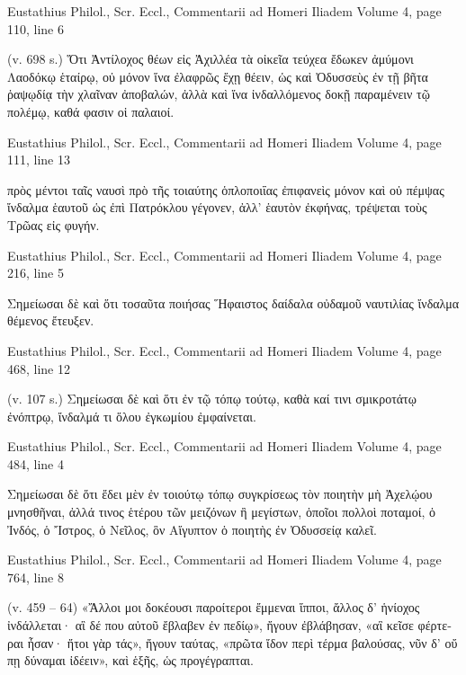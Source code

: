 \documentclass[12pt,letterpaper,twoside,final]{memoir}
\begin{document}
\begin{greek}
Eustathius Philol., Scr. Eccl., Commentarii ad Homeri Iliadem 
Volume 4, page 110, line 6

                                                               (v. 698 s.) Ὅτι 
Ἀντίλοχος θέων εἰς Ἀχιλλέα τὰ οἰκεῖα τεύχεα ἔδωκεν ἀμύμονι Λαοδόκῳ 
ἑταίρῳ, οὐ μόνον ἵνα ἐλαφρῶς ἔχῃ θέειν, ὡς καὶ Ὀδυσσεὺς ἐν τῇ βῆτα ῥαψῳδίᾳ 
τὴν χλαῖναν ἀποβαλών, ἀλλὰ καὶ ἵνα ἰνδαλλόμενος δοκῇ παραμένειν τῷ 
πολέμῳ, καθά φασιν οἱ παλαιοί. 



Eustathius Philol., Scr. Eccl., Commentarii ad Homeri Iliadem 
Volume 4, page 111, line 13

                                                                           πρὸς μέντοι ταῖς 
ναυσὶ πρὸ τῆς τοιαύτης ὁπλοποιΐας ἐπιφανεὶς μόνον καὶ οὐ πέμψας ἴνδαλμα 
ἑαυτοῦ ὡς ἐπὶ Πατρόκλου γέγονεν, ἀλλ' ἑαυτὸν ἐκφήνας, τρέψεται τοὺς Τρῶας 
εἰς φυγήν. 



Eustathius Philol., Scr. Eccl., Commentarii ad Homeri Iliadem 
Volume 4, page 216, line 5

                                                                         Σημείωσαι δὲ καὶ ὅτι 
τοσαῦτα ποιήσας Ἥφαιστος δαίδαλα οὐδαμοῦ ναυτιλίας ἴνδαλμα θέμενος 
ἔτευξεν. 



Eustathius Philol., Scr. Eccl., Commentarii ad Homeri Iliadem 
Volume 4, page 468, line 12

                  (v. 107 s.) Σημείωσαι δὲ καὶ ὅτι ἐν τῷ τόπῳ τούτῳ, καθὰ καί 
τινι σμικροτάτῳ ἐνόπτρῳ, ἴνδαλμά τι ὅλου ἐγκωμίου ἐμφαίνεται. 



Eustathius Philol., Scr. Eccl., Commentarii ad Homeri Iliadem 
Volume 4, page 484, line 4

                Σημείωσαι δὲ ὅτι ἔδει μὲν ἐν τοιούτῳ τόπῳ συγκρίσεως τὸν 
ποιητὴν μὴ Ἀχελῴου μνησθῆναι, ἀλλά τινος ἑτέρου τῶν μειζόνων ἢ 
μεγίστων, ὁποῖοι πολλοὶ ποταμοί, ὁ Ἰνδός, ὁ Ἴστρος, ὁ Νεῖλος, ὃν Αἴγυπτον ὁ 
ποιητὴς ἐν Ὀδυσσείᾳ καλεῖ. 



Eustathius Philol., Scr. Eccl., Commentarii ad Homeri Iliadem 
Volume 4, page 764, line 8

                                        (v. 459 – 64) «Ἄλλοι μοι δοκέουσι παροίτεροι 
ἔμμεναι ἵπποι, ἄλλος δ' ἡνίοχος ἰνδάλλεται· αἳ δέ που αὐτοῦ ἔβλαβεν ἐν 
πεδίῳ», ἤγουν ἐβλάβησαν, «αἳ κεῖσε φέρτεραι ἦσαν· ἤτοι γὰρ τάς», ἤγουν 
ταύτας, «πρῶτα ἴδον περὶ τέρμα βαλούσας, νῦν δ' οὔ πῃ δύναμαι ἰδέειν», καὶ 
ἑξῆς, ὡς προγέγραπται. 




\end{greek}
\end{document}
